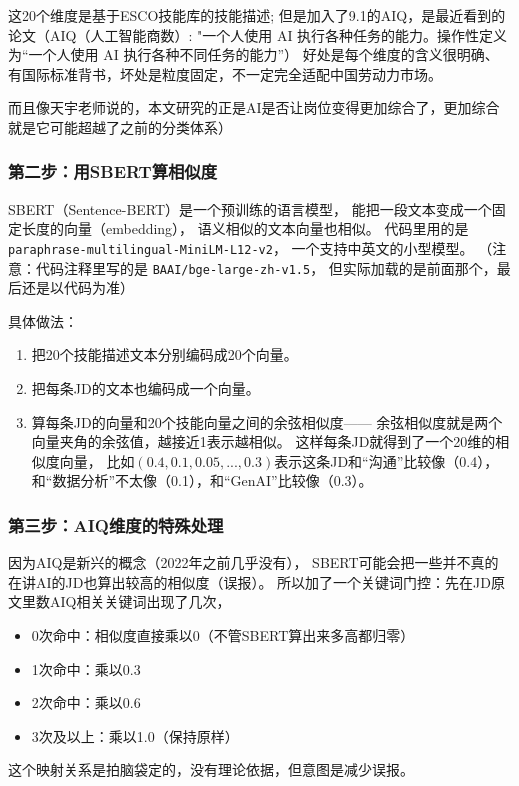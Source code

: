 \documentclass[12pt,a4paper]{ctexart}
\begin{document}
这20个维度是基于ESCO技能库的技能描述; 但是加入了9.1的AIQ，是最近看到的论文（AIQ（人工智能商数）: "一个人使用 AI 执行各种任务的能力。操作性定义为“一个人使用 AI 执行各种不同任务的能力”）
好处是每个维度的含义很明确、有国际标准背书，坏处是粒度固定，不一定完全适配中国劳动力市场。

而且像天宇老师说的，本文研究的正是AI是否让岗位变得更加综合了，更加综合就是它可能超越了之前的分类体系）

\subsubsection{第二步：用SBERT算相似度}

SBERT（Sentence-BERT）是一个预训练的语言模型，
能把一段文本变成一个固定长度的向量（embedding），
语义相似的文本向量也相似。
代码里用的是 \texttt{paraphrase-multilingual-MiniLM-L12-v2}，
一个支持中英文的小型模型。
（注意：代码注释里写的是 \texttt{BAAI/bge-large-zh-v1.5}，
但实际加载的是前面那个，最后还是以代码为准）

具体做法：
\begin{enumerate}
\item 把20个技能描述文本分别编码成20个向量。
\item 把每条JD的文本也编码成一个向量。
\item 算每条JD的向量和20个技能向量之间的余弦相似度——
余弦相似度就是两个向量夹角的余弦值，越接近1表示越相似。
这样每条JD就得到了一个20维的相似度向量，
比如$(0.4, 0.1, 0.05, ..., 0.3)$表示这条JD和``沟通''比较像（0.4），
和``数据分析''不太像（0.1），和``GenAI''比较像（0.3）。
\end{enumerate}

\subsubsection{第三步：AIQ维度的特殊处理}

因为AIQ是新兴的概念（2022年之前几乎没有），
SBERT可能会把一些并不真的在讲AI的JD也算出较高的相似度（误报）。
所以加了一个关键词门控：先在JD原文里数AIQ相关关键词出现了几次，
\begin{itemize}
\item 0次命中：相似度直接乘以0（不管SBERT算出来多高都归零）
\item 1次命中：乘以0.3
\item 2次命中：乘以0.6
\item 3次及以上：乘以1.0（保持原样）
\end{itemize}
这个映射关系是拍脑袋定的，没有理论依据，但意图是减少误报。
\end{document}
